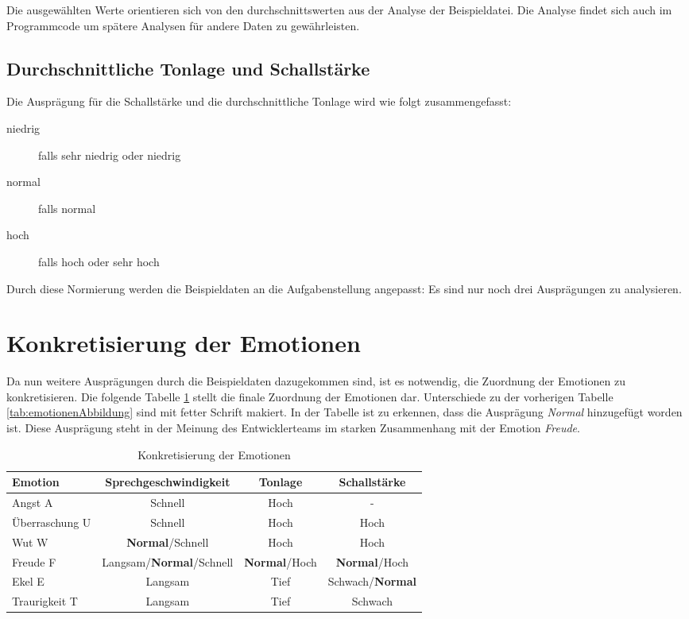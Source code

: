 Die ausgewählten Werte orientieren sich von den durchschnittswerten aus der Analyse der Beispieldatei. Die Analyse findet sich auch im Programmcode um spätere Analysen für andere Daten zu gewährleisten.

\subsection{Durchschnittliche Tonlage und Schallstärke}
Die Ausprägung für die Schallstärke und die durchschnittliche Tonlage wird wie folgt zusammengefasst:
\begin{description}
\item [niedrig] falls sehr niedrig oder niedrig
\item [normal] falls normal
\item [hoch] falls hoch oder sehr hoch
\end{description}
Durch diese Normierung werden die Beispieldaten an die Aufgabenstellung angepasst: Es sind nur noch drei Ausprägungen zu analysieren.

\section{Konkretisierung der Emotionen}
Da nun weitere Ausprägungen durch die Beispieldaten dazugekommen sind, ist es notwendig, die Zuordnung der Emotionen zu konkretisieren. Die folgende Tabelle \ref{tab:konkretisierteEmotionen} stellt die finale Zuordnung der Emotionen dar. Unterschiede zu der vorherigen Tabelle \ref{tab:emotionenAbbildung} sind mit fetter Schrift makiert. In der Tabelle ist zu erkennen, dass die Ausprägung \textit{Normal} hinzugefügt worden ist. Diese Ausprägung steht in der Meinung des Entwicklerteams im starken Zusammenhang mit der Emotion \textit{Freude}. 


\begin{table}[h]
\begin{tabular}{ l | c | c | c}
  Emotion & Sprechgeschwindigkeit & Tonlage & Schallstärke \\
  \hline 
  Angst A & Schnell & Hoch & - \\
  Überraschung U & Schnell & Hoch & Hoch \\
  Wut W & \textbf{Normal}/Schnell & Hoch & Hoch \\
  Freude F & Langsam/\textbf{Normal}/Schnell & \textbf{Normal}/Hoch &\textbf{Normal}/Hoch\\
  Ekel E & Langsam & Tief & Schwach/\textbf{Normal} \\
  Traurigkeit T & Langsam & Tief & Schwach \\
\end{tabular}
\caption{Konkretisierung der Emotionen}
\label{tab:konkretisierteEmotionen}
\end{table}

